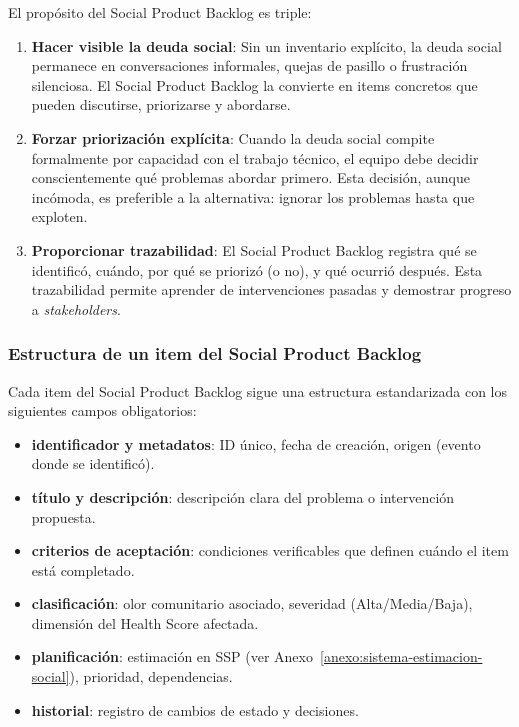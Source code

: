 El propósito del Social Product Backlog es triple:

\begin{enumerate}
    \item \textbf{Hacer visible la deuda social}: Sin un inventario explícito, la deuda social permanece en conversaciones informales, quejas de pasillo o frustración silenciosa. El Social Product Backlog la convierte en items concretos que pueden discutirse, priorizarse y abordarse.

    \item \textbf{Forzar priorización explícita}: Cuando la deuda social compite formalmente por capacidad con el trabajo técnico, el equipo debe decidir conscientemente qué problemas abordar primero. Esta decisión, aunque incómoda, es preferible a la alternativa: ignorar los problemas hasta que exploten.

    \item \textbf{Proporcionar trazabilidad}: El Social Product Backlog registra qué se identificó, cuándo, por qué se priorizó (o no), y qué ocurrió después. Esta trazabilidad permite aprender de intervenciones pasadas y demostrar progreso a \textit{stakeholders}.
\end{enumerate}

\subsubsection{Estructura de un item del Social Product Backlog}

Cada item del Social Product Backlog sigue una estructura estandarizada con los siguientes campos obligatorios:

\begin{itemize}
    \item \textbf{identificador y metadatos}: ID único, fecha de creación, origen (evento donde se identificó).
    \item \textbf{título y descripción}: descripción clara del problema o intervención propuesta.
    \item \textbf{criterios de aceptación}: condiciones verificables que definen cuándo el item está completado.
    \item \textbf{clasificación}: olor comunitario asociado, severidad (Alta/Media/Baja), dimensión del Health Score afectada.
    \item \textbf{planificación}: estimación en SSP (ver Anexo~\ref{anexo:sistema-estimacion-social}), prioridad, dependencias.
    \item \textbf{historial}: registro de cambios de estado y decisiones.
\end{itemize}

